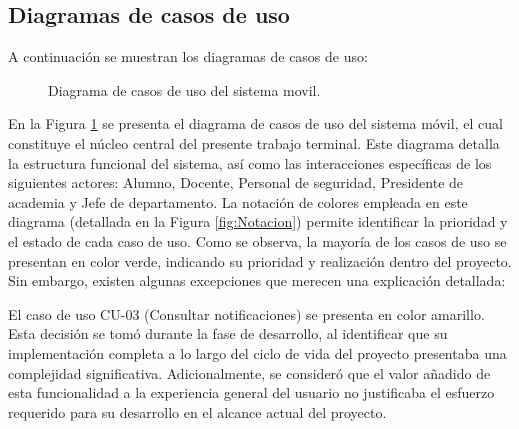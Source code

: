 \newpage

	\subsection{Diagramas de casos de uso}

A continuación se muestran los diagramas de casos de uso:


\begin{figure}[htbp!]
	\begin{center}
		\caption{Diagrama de casos de uso del sistema movil.}
		\label{fig:casosDeUso1}
	\end{center}
\end{figure}

En la Figura \ref{fig:casosDeUso1} se presenta el diagrama de casos de uso del sistema móvil, el cual constituye el núcleo central del presente trabajo terminal. Este diagrama detalla la estructura funcional del sistema, así como las interacciones específicas de los siguientes actores: Alumno, Docente, Personal de seguridad, Presidente de academia y Jefe de departamento. La notación de colores empleada en este diagrama (detallada en la Figura \ref{fig:Notacion}) permite identificar la prioridad y el estado de cada caso de uso.
Como se observa, la mayoría de los casos de uso se presentan en color verde, indicando su prioridad y realización dentro del proyecto. Sin embargo, existen algunas excepciones que merecen una explicación detallada:


El caso de uso CU-03 (Consultar notificaciones) se presenta en color amarillo. Esta decisión se tomó durante la fase de desarrollo, al identificar que su implementación completa a lo largo del ciclo de vida del proyecto presentaba una complejidad significativa. Adicionalmente, se consideró que el valor añadido de esta funcionalidad a la experiencia general del usuario no justificaba el esfuerzo requerido para su desarrollo en el alcance actual del proyecto.


